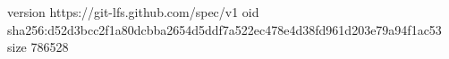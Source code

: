 version https://git-lfs.github.com/spec/v1
oid sha256:d52d3bcc2f1a80dcbba2654d5ddf7a522ec478e4d38fd961d203e79a94f1ac53
size 786528
